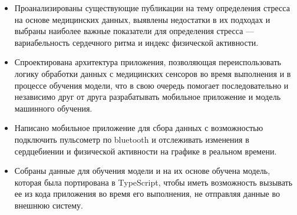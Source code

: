 \documentclass[14pt]{matmex-diploma-custom}
\begin{document}
\begin{itemize}
\item Проанализированы существующие публикации на тему определения стресса на
  основе медицинских данных, выявлены недостатки в их подходах и выбраны
  наиболее важные показатели для определения стресса — вариабельность сердечного
  ритма и индекс физической активности.
\item Спроектирована архитектура приложения, позволяющая переиспользовать логику
  обработки данных с медицинских сенсоров во время выполнения и в процессе
  обучения модели, что в свою очередь помогает последовательно и независимо друг
  от друга разрабатывать мобильное приложение и модель машинного обучения.
\item Написано мобильное приложение для сбора данных с возможностью подключить
  пульсометр по bluetooth и отслеживать изменения в сердцебиении и физической
  активности на графике в реальном времени.
\item Собраны данные для обучения модели и на их основе обучена модель, которая
  была портирована в TypeScript, чтобы иметь возможность вызывать ее из кода
  приложения во время его выполнения, не отправляя данные во внешнюю систему.
\end{itemize}

\setmonofont[Path=assets/fonts/, UprightFont=*-Regular, BoldFont=*-Bold,
ItalicFont=*-Italic, BoldItalicFont=*-BoldItalic,
Mapping=tex-text]{CMUTypewriterText}

 
\end{document}
